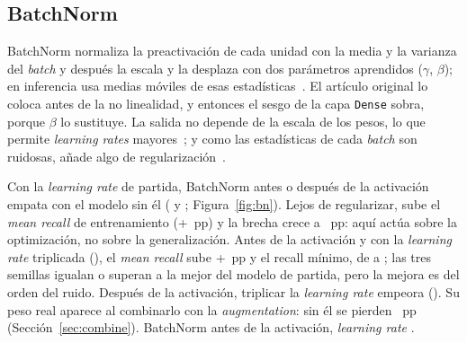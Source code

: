 \begin{figure}[!htbp]
  \centering
  \begin{minipage}[t]{0.485\linewidth}
    \centering
    \caption{}
    \label{fig:dropout}
  \end{minipage}\hfill
  \begin{minipage}[t]{0.485\linewidth}
    \centering
    \caption{}
    \label{fig:l2}
  \end{minipage}
\end{figure}

\subsection{BatchNorm}
BatchNorm normaliza la preactivación de cada unidad con la media y la varianza del \emph{batch} y después la escala y
la desplaza con dos parámetros aprendidos ($\gamma$, $\beta$); en inferencia usa medias móviles de esas
estadísticas~\cite{ioffe}. El artículo original lo coloca antes de la no linealidad, y entonces el sesgo de la capa
\texttt{Dense} sobra, porque $\beta$ lo sustituye. La salida no depende de la escala de los pesos, lo que permite
\emph{learning rates} mayores~\cite{ioffe,santurkar}; y como las estadísticas de cada \emph{batch} son ruidosas, añade
algo de regularización~\cite{ioffe}.

{Con la \emph{learning rate} de partida, BatchNorm antes o después de la activación empata con el modelo sin él
( y ; Figura~\ref{fig:bn}). Lejos de regularizar, sube el
\emph{mean recall} de entrenamiento (+~pp) y la brecha crece a ~pp: aquí
actúa sobre la optimización, no sobre la generalización.}
{Antes de la activación y con la \emph{learning rate} triplicada (), el \emph{mean recall} sube
+~pp y el recall mínimo, de  a ; las tres semillas igualan o
superan a la mejor del modelo de partida, pero la mejora es del orden del ruido. Después de la activación, triplicar
la \emph{learning rate} empeora (). Su peso real aparece al combinarlo con la
\emph{augmentation}: sin él se pierden ~pp (Sección~\ref{sec:combine}).}
{BatchNorm antes de la activación, \emph{learning rate} .}

